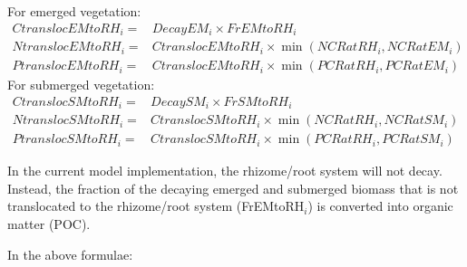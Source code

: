For emerged vegetation:
%
\begin{align}
\nonumber CtranslocEMtoRH_i = &DecayEM_i \times FrEMtoRH_i                            \\
\nonumber NtranslocEMtoRH_i = &CtranslocEMtoRH_i \times \min( NCRatRH_i, NCRatEM_i )   \\
          PtranslocEMtoRH_i = &CtranslocEMtoRH_i \times \min( PCRatRH_i, PCRatEM_i )
\end{align}
%
For submerged vegetation:
%
\begin{align}
\nonumber CtranslocSMtoRH_i = &DecaySM_i \times FrSMtoRH_i                            \\
\nonumber NtranslocSMtoRH_i = &CtranslocSMtoRH_i \times \min( NCRatRH_i, NCRatSM_i )   \\
          PtranslocSMtoRH_i = &CtranslocSMtoRH_i \times \min( PCRatRH_i, PCRatSM_i )
\end{align}
%

In the current model implementation, the rhizome/root system will not decay.
Instead, the fraction of the decaying emerged and submerged biomass that is not translocated to the
rhizome/root system (FrEMtoRH$_i$) is converted into organic matter (POC).

In the above formulae:

